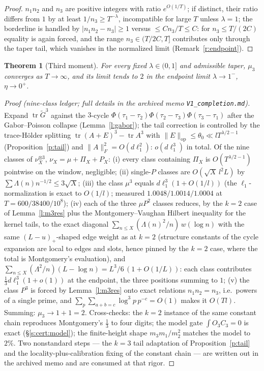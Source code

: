 \documentclass[11pt]{article}
\numberwithin{equation}{section}
\newtheorem{theorem}{Theorem}[section]
\theoremstyle{definition}
\theoremstyle{remark}
\newcommand{\LL}{\Lambda}
\begin{document}
\begin{proof}
$n_1n_2$ and $n_3$ are positive integers with ratio $e^{O(1/T)}$;
if distinct, their ratio differs from $1$ by at least
$1/n_3\ge T^{-\lambda}$, incompatible for large $T$ unless
$\lambda=1$; the borderline is handled by $|n_1n_2-n_3|\ge1$
versus $\le Cn_3/T\le C$: for $n_3\le T/(2C)$ equality is again
forced, and the range $n_3\in(T/2C,T]$ contributes only through
the taper tail, which vanishes in the normalized limit
(Remark~\ref{r:endpoint}).
\end{proof}

\begin{theorem}[Third moment]\label{t:m3}
For every fixed $\lambda\in(0,1]$ and admissible taper, $\mu_3$
converges as $T\to\infty$, and its limit tends to $2$ in the
endpoint limit $\lambda\to1^-$, $\eta\to0^+$.
\end{theorem}

\begin{proof}[Proof (nine-class ledger; full details in the
archived memo \texttt{V1\_completion.md})]
Expand $\operatorname{tr}\widetilde G^{3}$ against the $3$-cycle
$\Phi(\tau_1-\tau_2)\Phi(\tau_2-\tau_3)\Phi(\tau_3-\tau_1)$ after
the Gabor--Poisson collapse (Lemma~\ref{l:gabor}); the tail
correction is controlled by the trace-H\"older splitting
$\operatorname{tr}(A+E)^3-\operatorname{tr}A^3$ with
$\|E\|_{\mathrm{op}}\le\theta_0\ll lT^{\lambda/2-1}$
(Proposition~\ref{p:tail}) and $\|A\|_F^2=O(d\ell_1^2)$:
$o(d\ell_1^3)$ in total. Of the nine classes of
$\nu_X^{\otimes3}$, $\nu_X=\mu+\Pi_X+P_X$: (i) every class
containing $\Pi_X$ is $O(T^{\lambda/2-1})$ pointwise on the
window, negligible; (ii) single-$P$ classes are
$O(\sqrt X\,l^{2}L)$ by $\sum\LL(n)n^{-1/2}\le3\sqrt X$; (iii)
the class $\mu^3$ equals $d\ell_1^3(1+O(1/l))$ (the
$\ell_1$-normalization is exact to $O(1/l)$; measured
$1.0048/1.0014/1.0004$ at $T=600/38400/10^{8}$); (iv) each of
the three $\mu P^2$ classes reduces, by the $k=2$ case of
Lemma~\ref{l:m3res} plus the Montgomery--Vaughan Hilbert
inequality for the kernel tails, to the exact diagonal
$\sum_{n\le X}(\LL(n)^2/n)\,w(\log n)$ with the same
$(L-u)_+$-shaped edge weight as at $k=2$ (structure constants of
the cycle expansion are local to edges and slots, hence pinned by
the $k=2$ case, where the total is Montgomery's evaluation), and
$\sum_{n\le X}(\LL^2/n)(L-\log n)=L^3/6\,(1+O(1/L))$: each class
contributes $\tfrac13d\ell_1^3(1+o(1))$ at the endpoint, the
three positions summing to $1$; (v) the class $P^3$ is forced by
Lemma~\ref{l:m3res} onto exact relations $n_1n_2=n_3$, i.e.\
powers of a single prime, and $\sum_p\sum_{a+b=c}\log^3p\,p^{-c}
=O(1)$ makes it $O(Tl)$. Summing: $\mu_3\to1+1=2$. Cross-checks:
the $k=2$ instance of the same constant chain reproduces
Montgomery's $\tfrac13$ to four digits; the model gate
$\int O_3C_3=0$ is exact (\S\ref{s:cert:model}); the
finite-height shape $m_3m_1/m_2^2$ matches the model to $2\%$.
Two nonstandard steps --- the $k=3$ tail adaptation of
Proposition~\ref{p:tail} and the locality-plus-calibration fixing of
the constant chain --- are written out in the archived memo and
are consumed at that rigor.
\end{proof}
\end{document}
